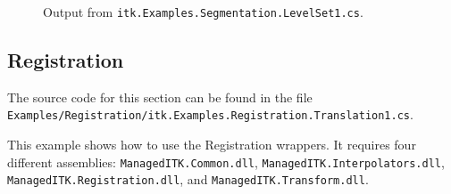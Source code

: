 \documentclass{InsightArticle}
\def\code#1{\texttt{#1}}
\begin{document}
\begin{figure}
{    }
    \hspace{0.25mm}
    \hspace{0.25mm}
    \hspace{0.25mm}
    \hspace{0.25mm}
    \caption{Output from \code{itk.Examples.Segmentation.LevelSet1.cs}.}
	\label{fig:ExamplesSegmentationLevelSet1a}
\end{figure}
\fi


\subsection{Registration}
The source code for this section can be found in the file\\
\code{Examples/Registration/itk.Examples.Registration.Translation1.cs}.

This example shows how to use the Registration wrappers.
It requires four different assemblies:
\code{ManagedITK.Common.dll},
\code{ManagedITK.Interpolators.dll},
\code{ManagedITK.Registration.dll}, and
\code{ManagedITK.Transform.dll}.
\end{document}
